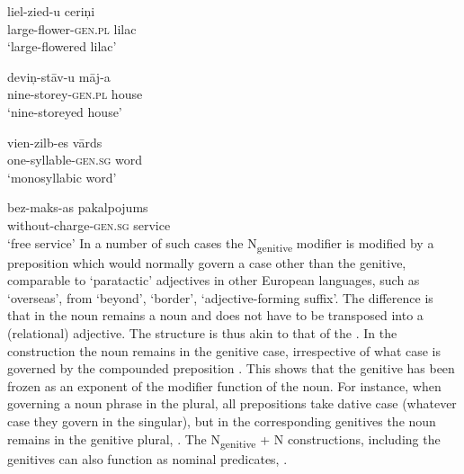 \documentclass[output=paper,colorlinks,citecolor=brown]{langscibook}
\begin{document}
\ea\label{genpl}

\begin{xlist}
	\ex
	\gll	 liel-zied-u 					ceriņi				\\
	large-flower-\textsc{gen.pl}	 lilac	\\
	\glt		‘large-flowered lilac’
	
	\ex
	\gll	deviņ-stāv-u 				māj-a					\\
	nine-storey-\textsc{gen.pl} 	house 		\\
	\glt		‘nine-storeyed house’
\end{xlist}
\z


\ea
\ea\label{vienzilbes}

\gll	 vien-zilb-es vārds				\\
one-syllable-\textsc{gen.sg} 	word			\\
\glt		‘monosyllabic word’

\ex
\gll	 bez-maks-as pakalpojums			\\
without-charge-\textsc{gen.sg} service		\\
\glt		‘free service’ 
\z
\z
In a number of such cases the  N\textsubscript{genitive} modifier is modified by a preposition which would normally govern a case other than the genitive, comparable to `paratactic' adjectives in other European languages, such as   `overseas', from  `beyond',  `border',  `adjective-forming suffix'. The difference is that in  the noun remains a noun and does not have to be transposed into a (relational) adjective. The structure is thus akin to that of the  . In the  construction the noun remains in the genitive case, irrespective of what case is governed by the compounded preposition \citep[181]{kalnacalokmane2016}.  This shows that the genitive has been frozen as an exponent of the modifier function of the noun. For instance, when governing a noun phrase in the plural, all  prepositions take dative case (whatever case they govern in the singular), but  in the corresponding  genitives the noun remains in the genitive plural, . The N\textsubscript{genitive} + N constructions, including the  genitives can also function as nominal predicates, . 
\end{document}

